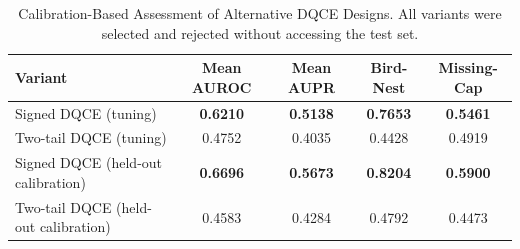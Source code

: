 \begin{table}[t]
\caption{Calibration-Based Assessment of Alternative DQCE Designs.
All variants were selected and rejected without accessing the test set.}
\label{tab:failed_extensions}
\centering
\setlength{\tabcolsep}{3.4pt}
\begin{tabular}{lcccc}
\hline
Variant &
Mean AUROC &
Mean AUPR &
Bird-Nest &
Missing-Cap \\
\hline
Signed DQCE (tuning) &
\textbf{0.6210} &
\textbf{0.5138} &
\textbf{0.7653} &
\textbf{0.5461} \\
Two-tail DQCE (tuning) &
0.4752 &
0.4035 &
0.4428 &
0.4919 \\
\hline
Signed DQCE (held-out calibration) &
\textbf{0.6696} &
\textbf{0.5673} &
\textbf{0.8204} &
\textbf{0.5900} \\
Two-tail DQCE (held-out calibration) &
0.4583 &
0.4284 &
0.4792 &
0.4473 \\
\hline
\end{tabular}
\end{table}
